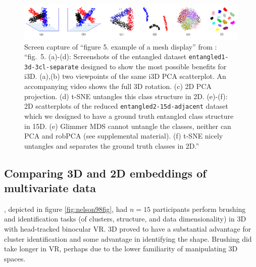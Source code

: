 \documentclass{monashthesis}
\begin{document}
\begin{figure}

{\centering \includegraphics[width=1\linewidth]{./figures/sedlmair13fig} 

}

\caption{Screen capture of ``figure 5. example of a mesh display'' from \textcite{sedlmair_empirical_2013}: ``fig.~5. (a)-(d): Screenshots of the entangled dataset \texttt{entangled1-3d-3cl-separate} designed to show the most possible benefits for i3D. (a),(b) two viewpoints of the same i3D PCA scatterplot. An accompanying video shows the full 3D rotation. (c) 2D PCA projection. (d) t-SNE untangles this class structure in 2D. (e)-(f): 2D scatterplots of the reduced \texttt{entangled2-15d-adjacent} dataset which we designed to have a ground truth entangled class structure in 15D. (e) Glimmer MDS cannot untangle the classes, neither can PCA and robPCA (see supplemental material). (f) t-SNE nicely untangles and separates the ground truth classes in 2D.''}\label{fig:sedlmair13fig}
\end{figure}

\hypertarget{comparing-3d-and-2d-embeddings-of-multivariate-data}{%
\subsection{Comparing 3D and 2D embeddings of multivariate data}\label{comparing-3d-and-2d-embeddings-of-multivariate-data}}

\textcite{nelson_xgobi_1998}, depicted in figure \ref{fig:nelson98fig}, had \(n=15\) participants perform brushing and identification tasks (of clusters, structure, and data dimensionality) in 3D with head-tracked binocular VR. 3D proved to have a substantial advantage for cluster identification and some advantage in identifying the shape. Brushing did take longer in VR, perhaps due to the lower familiarity of manipulating 3D spaces.
\end{document}
